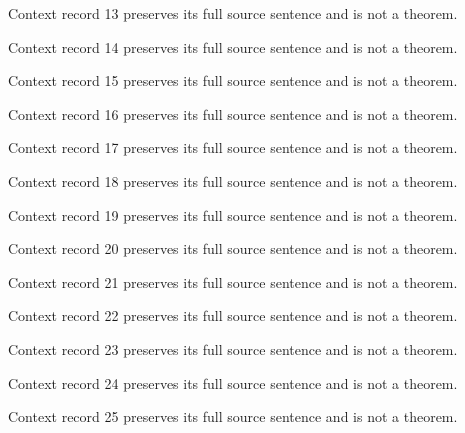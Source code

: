 \documentclass{article}
\begin{document}
\begin{remark}\label{train:context:13}Context record 13 preserves its full source sentence and is not a theorem.\end{remark}
\begin{remark}\label{train:context:14}Context record 14 preserves its full source sentence and is not a theorem.\end{remark}
\begin{remark}\label{train:context:15}Context record 15 preserves its full source sentence and is not a theorem.\end{remark}
\begin{remark}\label{train:context:16}Context record 16 preserves its full source sentence and is not a theorem.\end{remark}
\begin{remark}\label{train:context:17}Context record 17 preserves its full source sentence and is not a theorem.\end{remark}
\begin{remark}\label{train:context:18}Context record 18 preserves its full source sentence and is not a theorem.\end{remark}
\begin{remark}\label{train:context:19}Context record 19 preserves its full source sentence and is not a theorem.\end{remark}
\begin{remark}\label{train:context:20}Context record 20 preserves its full source sentence and is not a theorem.\end{remark}
\begin{remark}\label{train:context:21}Context record 21 preserves its full source sentence and is not a theorem.\end{remark}
\begin{remark}\label{train:context:22}Context record 22 preserves its full source sentence and is not a theorem.\end{remark}
\begin{remark}\label{train:context:23}Context record 23 preserves its full source sentence and is not a theorem.\end{remark}
\begin{remark}\label{train:context:24}Context record 24 preserves its full source sentence and is not a theorem.\end{remark}
\begin{remark}\label{train:context:25}Context record 25 preserves its full source sentence and is not a theorem.\end{remark}
\end{document}
